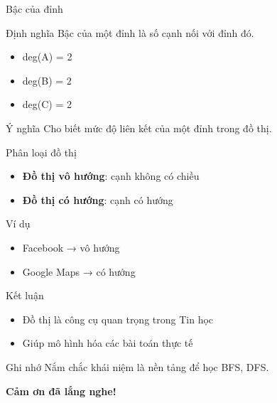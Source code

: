 \documentclass[aspectratio=169]{beamer}
\begin{document}
\begin{frame}{Bậc của đỉnh}
\begin{block}{Định nghĩa}
Bậc của một đỉnh là số cạnh nối với đỉnh đó.
\end{block}

\begin{itemize}
    \item deg(A) = 2
    \item deg(B) = 2
    \item deg(C) = 2
\end{itemize}

\pause

\begin{block}{Ý nghĩa}
Cho biết mức độ liên kết của một đỉnh trong đồ thị.
\end{block}
\end{frame}

\begin{frame}{Phân loại đồ thị}
\begin{itemize}
    \item \textbf{Đồ thị vô hướng}: cạnh không có chiều
    \item \textbf{Đồ thị có hướng}: cạnh có hướng
\end{itemize}

\pause

\begin{block}{Ví dụ}
\begin{itemize}
    \item Facebook → vô hướng
    \item Google Maps → có hướng
\end{itemize}
\end{block}
\end{frame}

\begin{frame}{Kết luận}
\begin{itemize}
    \item Đồ thị là công cụ quan trọng trong Tin học
    \item Giúp mô hình hóa các bài toán thực tế
\end{itemize}

\begin{block}{Ghi nhớ}
Nắm chắc khái niệm là nền tảng để học BFS, DFS.
\end{block}
\end{frame}

\begin{frame}
\begin{center}
\Huge \textbf{Cảm ơn đã lắng nghe!}
\end{center}
\end{frame}
\end{document}
